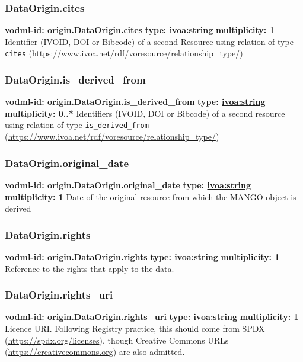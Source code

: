     \subsubsection{DataOrigin.cites}
    \textbf{vodml-id: origin.DataOrigin.cites} \newline
    \textbf{type: \hyperref[sect:ivoa]{ivoa:string}} \newline
    \textbf{multiplicity: 1} \newline
    Identifier (IVOID, DOI or Bibcode) of a second Resource using relation of type \texttt{cites} (\url{https://www.ivoa.net/rdf/voresource/relationship\_type/})

    \subsubsection{DataOrigin.is\_derived\_from}
    \textbf{vodml-id: origin.DataOrigin.is\_derived\_from} \newline
    \textbf{type: \hyperref[sect:ivoa]{ivoa:string}} \newline
    \textbf{multiplicity: 0..*} \newline
    Identifiers (IVOID, DOI or Bibcode) of a second resource using relation of type \texttt{is\_derived\_from} (\url{https://www.ivoa.net/rdf/voresource/relationship\_type/})

    \subsubsection{DataOrigin.original\_date}
    \textbf{vodml-id: origin.DataOrigin.original\_date} \newline
    \textbf{type: \hyperref[sect:ivoa]{ivoa:string}} \newline
    \textbf{multiplicity: 1} \newline
    Date of the original resource from which the MANGO object is derived

    \subsubsection{DataOrigin.rights}
    \textbf{vodml-id: origin.DataOrigin.rights} \newline
    \textbf{type: \hyperref[sect:ivoa]{ivoa:string}} \newline
    \textbf{multiplicity: 1} \newline
    Reference to the rights that apply to the data.

    \subsubsection{DataOrigin.rights\_uri}
    \textbf{vodml-id: origin.DataOrigin.rights\_uri} \newline
    \textbf{type: \hyperref[sect:ivoa]{ivoa:string}} \newline
    \textbf{multiplicity: 1} \newline
    Licence URI. Following Registry practice, this should come from SPDX (\url{https://spdx.org/licenses}), though Creative Commons URLs (\url{https://creativecommons.org}) are also admitted.

